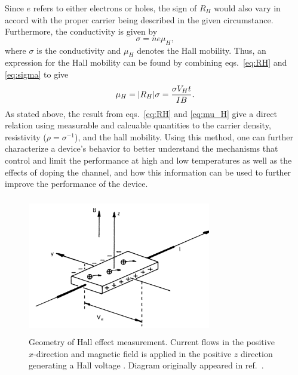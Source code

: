 Since $e$ refers to either electrons or holes, the sign of $R_H$ would also vary in accord with the proper carrier being described in the given circumstance. Furthermore, the conductivity is given by
\begin{equation}\label{eq:sigma}
	\sigma = n e \mu_H,
\end{equation}
where $\sigma$ is the conductivity and $\mu_H$ denotes the Hall mobility. Thus, an expression for the Hall mobility can be found by combining eqs.~\ref{eq:RH} and \ref{eq:sigma} to give
\begin{equation}\label{eq:mu_H}
	\mu_H = \abs{R_H}\sigma = \frac{\sigma V_H t}{IB}.
\end{equation}
As stated above, the result from eqs.~\ref{eq:RH} and \ref{eq:mu_H} give a direct relation using measurable and calcuable quantities to the carrier density, resistivity ($\rho=\sigma^{-1}$), and the hall mobility. Using this method, one can further characterize a device's behavior to better understand the mechanisms that control and limit the performance at high and low temperatures as well as the effects of doping the channel, and how this information can be used to further improve the performance of the device.
\begin{figure}[ht]
	\centering
	\includegraphics[height=6cm,width=8cm]{figs/results/hall_diagram}
	\caption[Hall effect measurement diagram]{Geometry of Hall effect measurement. Current flows in the positive $x$-direction and magnetic field is applied in the positive $z$ direction generating a Hall voltage \cite{HallEffectNIST}. Diagram originally appeared in ref.~\cite{HallDiagram}.}
	\label{fig:hall_diagram}
\end{figure}

